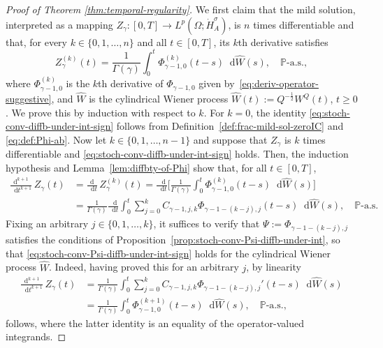 \documentclass[reqno]{amsart}
\numberwithin{equation}{section}
\newcommand{\bbP}{\mathbb{P}}
\newcommand{\rd}{\mathop{}\!\mathrm{d}}
\newcommand{\from}{\colon}
\newcommand{\Hdot}[1]{\dot{H}^{#1}_A}
\theoremstyle{remark}
\theoremstyle{definition}
\begin{document}
\begin{proof}[Proof of Theorem \ref{thm:temporal-regularity}]
	We first claim that 
	the mild solution, 
	interpreted as a mapping 
	$Z_\gamma\from[0,T]\to L^p(\Omega;\Hdot{\sigma})$,
	is $n$ times 
	differentiable 
	and that, for every $k \in \{0,1,\dots,n\}$ 
	and all $t\in[0,T]$, 
	its $k$th derivative satisfies 
	\begin{equation}\label{eq:stoch-conv-diffb-under-int-sign}
	Z_\gamma^{(k)}(t) 
	= 
	\frac{1}{\Gamma(\gamma)} 
	\int_0^t \Phi_{\gamma-1,0}^{(k)}(t-s) \rd \widehat{W}(s), 
	\quad 
	\text{$\bbP$-a.s.}, 
	\end{equation} 
	where $\Phi_{\gamma-1,0}^{(k)}$ 
	is the $k$th derivative of $\Phi_{\gamma-1,0}$ 
	given by~\eqref{eq:deriv-operator-suggestive}, 
	and $\widehat{W}$ 
	is the cylindrical Wiener process
	$\widehat{W}(t) := Q^{-\frac{1}{2}} W^Q(t)$, $t\geq 0$. 
	We prove this by induction with respect to $k$.
	For $k=0$, the 
	identity
	\eqref{eq:stoch-conv-diffb-under-int-sign} follows from 
	Definition~\ref{def:frac-mild-sol-zeroIC} 
	and 
	\eqref{eq:def:Phi-ab}. 
	Now let 
	${k \in \{0,1,\dots,n-1\}}$ 
	and 
	suppose that  
	$Z_\gamma$ is $k$ times differentiable and  \eqref{eq:stoch-conv-diffb-under-int-sign} 
	holds. 
	Then, the induction hypothesis 
	and Lemma~\ref{lem:diffbty-of-Phi} show that, 
	for all $t\in[0,T]$,
	\begin{align*}
	\frac{\mathrm d^{k+1}}{\rd t^{k+1}} \, 
	Z_\gamma(t) 
	&=
	\frac{\mathrm d}{\rd t} \, 
	Z_\gamma^{(k)}(t) 
	= 
	\frac{\rd}{\rd t} 
	\biggl[  
	\frac{1}{\Gamma(\gamma)}
	\int_0^t \Phi^{(k)}_{\gamma-1,0}(t-s) \rd \widehat{W}(s) 
	\biggr] 
	\\
	&= 
	\frac{1}{\Gamma(\gamma)} 
	\frac{\rd}{\rd t} 
	\int_0^t \sum_{j=0}^k 
	C_{\gamma-1,j,k} \Phi_{\gamma-1-(k-j),j}(t-s) \rd \widehat{W}(s),
	\quad 
	\text{$\bbP$-a.s.} 
	\end{align*}
	Fixing an arbitrary $j \in \{0,1,\dots,k\}$, 
	it suffices to verify that $\Psi := \Phi_{\gamma-1-(k-j),j}$  
	satisfies the conditions of 
	Proposition~\ref{prop:stoch-conv-Psi-diffb-under-int}, 
	so that \eqref{eq:stoch-conv-Psi-diffb-under-int-sign} holds 
	for the cylindrical Wiener process $\widehat{W}$. 
	Indeed, having proved this for an arbitrary $j$, 
	by linearity 
	\begin{align*}
	\frac{\mathrm d^{k+1}}{\rd t^{k+1}} \, 
	Z_\gamma(t) 
	&= 
	\frac{1}{\Gamma(\gamma)}
	\int_0^t \sum_{j=0}^k C_{\gamma-1,j,k} \Phi_{\gamma-1-(k-j),j}'(t-s) \rd \widehat{W}(s) 
	\\
	&= 
	\frac{1}{\Gamma(\gamma)}
	\int_0^t\Phi_{\gamma-1,0}^{(k+1)}(t-s) \rd \widehat{W}(s), 
	\quad 
	\text{$\bbP$-a.s.}, 
	\end{align*} 
	follows, 
	where the latter identity is an equality of the operator-valued integrands. 
	

\end{proof}
\end{document}
